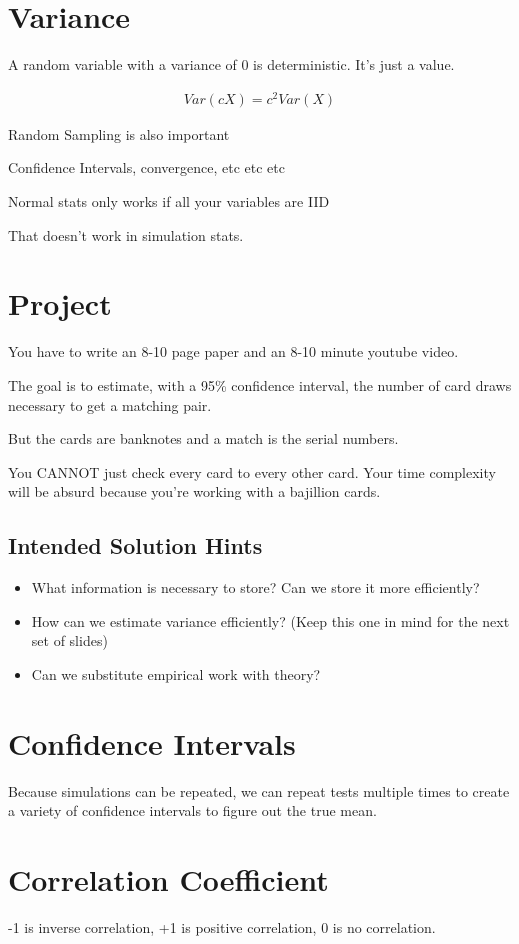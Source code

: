 \documentclass[fleqn]{report}
\newcommand{\equations} [1] {
\begin{gather*}
#1
\end{gather*}
}
\begin{document}
\section{Variance}
A random variable with a variance of 0 is deterministic. It's just a value. 

\equations{
    Var(cX) = c^2 Var(X)
}

Random Sampling is also important 

Confidence Intervals, convergence, etc etc etc 

Normal stats only works if all your variables are IID 

That doesn't work in simulation stats. 

\section{Project}
You have to write an 8-10 page paper and an 8-10 minute youtube video. 

The goal is to estimate, with a 95\% confidence interval, the number 
of card draws necessary to get a matching pair. 

But the cards are banknotes and a match is the serial numbers. 

You CANNOT just check every card to every other card. Your time complexity 
will be absurd because you're working with a bajillion cards.

\subsection{Intended Solution Hints}
\begin{itemize}
    \item
    What information is necessary to store? Can we store it more efficiently? 
    \item
    How can we estimate variance efficiently? 
    (Keep this one in mind for the next set of slides)
    \item
    Can we substitute empirical work with theory?
\end{itemize}

\section{Confidence Intervals}
Because simulations can be repeated, we can repeat tests multiple times to create 
a variety of confidence intervals to figure out the true mean. 

\section{Correlation Coefficient}
-1 is inverse correlation, +1 is positive correlation, 0 is no correlation. 
\end{document}
